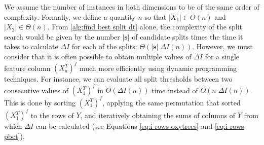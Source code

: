 \documentclass[sn-mathphys-num]{sn-jnl}%
\newcommand{\T}{^T}
\newcommand{\s}{\mathbf{s}}
\theoremstyle{thmstyleone}%
\theoremstyle{thmstyletwo}%
\theoremstyle{thmstylethree}%
\begin{document}
\begin{appendices}
We assume the number of instances in both dimensions to be of the same order of complexity. Formally, we define a quantity $n$ so that $|X_1| \in \Theta(n)$ and $|X_2| \in \Theta(n)$.
%
From \autoref{alg:find best split dt} alone, the complexity of the split search would be given by the number $|\s|$ of candidate splits times the time it takes to calculate $\Delta I$ for each of the splits: $\Theta(|\s| \;\Delta I(n))$. However, we must consider that it is often possible to obtain multiple values of $\Delta I$ for a single feature column $(X_a\T)^f$ much more efficiently using dynamic programming techniques. For instance, we can evaluate all split thresholds between two consecutive values of $(X_1\T)^f$ in $\Theta(\Delta I(n))$ time instead of $\Theta (n\;\Delta I (n))$. This is done by sorting $(X_1\T)^f$, applying the same permutation that sorted $(X_1\T)^f$ to the rows of $Y$, and iteratively obtaining the sums of columns of $Y$ from which $\Delta I$ can be calculated (see Equations \ref{eq:i rows oxytrees} and \ref{eq:i rows pbct}).
% 
% 

\end{appendices}
\end{document}
